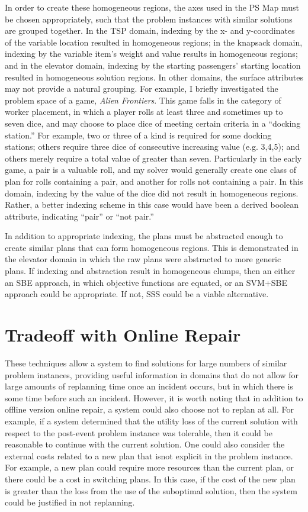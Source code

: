 In order to create these homogeneous regions, the axes used in the PS Map must be chosen appropriately, such that the problem instances with similar solutions are grouped together.  In the TSP domain, indexing by the x- and y-coordinates of the variable location resulted in homogeneous regions; in the knapsack domain, indexing by the variable item's weight and value results in homogeneous regions; and in the elevator domain, indexing by the starting passengers' starting location resulted in homogeneous solution regions.  In other domains, the surface attributes may not provide a natural grouping. For example, I briefly investigated the problem space of a game, \textit{Alien Frontiers}.    This game falls in the category of worker placement, in which a player rolls at least three and sometimes up to seven dice, and may choose to place dice of meeting certain criteria in a ``docking station.''  For example, two or three of a kind is required for some docking stations; others require three dice of consecutive increasing value (e.g. 3,4,5); and others merely require a total value of greater than seven.  Particularly in the early game, a pair is a valuable roll, and my solver would generally create one class of plan for rolls containing a pair, and another for rolls not containing a pair.  In this domain, indexing by the value of the dice did not result in homogeneous regions.  Rather, a better indexing scheme in this case would have been a derived boolean attribute, indicating ``pair'' or ``not pair.''

In addition to appropriate indexing, the plans must be abstracted enough to create similar plans that can form homogeneous regions.  This is demonstrated in the elevator domain in which the raw plans were abstracted to more generic plans.  If indexing and abstraction result in homogeneous clumps, then an either an SBE approach, in which objective functions are equated, or an SVM+SBE approach could be appropriate.  If not, SSS could be a viable alternative.


\section{Tradeoff with Online Repair}
These techniques allow a system to find solutions for large numbers of similar problem instances, providing useful information in domains that do not allow for large amounts of replanning time once an incident occurs, but in which there is some time before such an incident.  However, it is worth noting that in addition to offline version online repair, a system could also choose not to replan at all.  For example, if a system determined that the utility loss of the current solution with respect to the post-event problem instance was tolerable, then it could be reasonable to continue with the current solution.  One could also consider the external costs related to a new plan that isnot explicit in the problem instance.   For example, a new plan could require more resources than the current plan, or there could be a cost in switching plans.  In this case, if the cost of the new plan is greater than the loss from the use of the suboptimal solution, then the system could be justified in not replanning.

